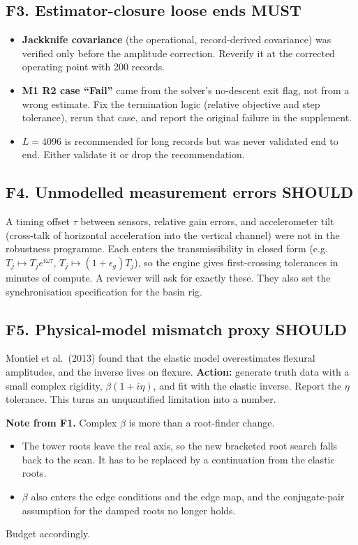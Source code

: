 \documentclass[10pt,a4paper]{article}
\newcommand{\MUST}{\textcolor{must}{\textbf{MUST}}}
\newcommand{\SHOULD}{\textcolor{should}{\textbf{SHOULD}}}
\begin{document}
\subsection*{F3. Estimator-closure loose ends \MUST}
\begin{itemize}
\item \textbf{Jackknife covariance} (the operational, record-derived covariance) was verified only before the amplitude correction. Reverify it at the corrected operating point with 200 records.
\item \textbf{M1 R2 case ``Fail''} came from the solver's no-descent exit flag, not from a wrong estimate. Fix the termination logic (relative objective and step tolerance), rerun that case, and report the original failure in the supplement.
\item \textbf{$L=4096$} is recommended for long records but was never validated end to end. Either validate it or drop the recommendation.
\end{itemize}

\subsection*{F4. Unmodelled measurement errors \SHOULD}
A timing offset $\tau$ between sensors, relative gain errors, and accelerometer tilt (cross-talk of horizontal acceleration into the vertical channel) were not in the robustness programme. Each enters the transmissibility in closed form (e.g.\ $T_j\mapsto T_j e^{i\omega\tau}$, $T_j\mapsto(1+\epsilon_g)T_j$), so the engine gives first-crossing tolerances in minutes of compute. A reviewer will ask for exactly these. They also set the synchronisation specification for the basin rig.

\subsection*{F5. Physical-model mismatch proxy \SHOULD}
Montiel et al.\ (2013) found that the elastic model overestimates flexural amplitudes, and the inverse lives on flexure. \textbf{Action:} generate truth data with a small complex rigidity, $\beta(1+i\eta)$, and fit with the elastic inverse. Report the $\eta$ tolerance. This turns an unquantified limitation into a number.

\textbf{Note from F1.} Complex $\beta$ is more than a root-finder change.
\begin{itemize}
\item The tower roots leave the real axis, so the new bracketed root search falls back to the scan. It has to be replaced by a continuation from the elastic roots.
\item $\beta$ also enters the edge conditions and the edge map, and the conjugate-pair assumption for the damped roots no longer holds.
\end{itemize}
Budget accordingly.
\end{document}
